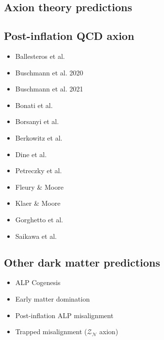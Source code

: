 \documentclass[8pt,twocolumn]{extarticle}
\begin{document}
\begin{mdframed}
\vspace{-1em}
\section{Axion theory predictions}\vspace{-0.5em}
\subsection{Post-inflation QCD axion}
\begin{itemize}\setlength\itemsep{-0.5em}
	\item Ballesteros et al.~\cite{Ballesteros:2016euj}	
	\item Buschmann et al. 2020~\cite{Buschmann:2019icd}
	\item Buschmann et al. 2021~\cite{Buschmann:2021sdq}
	\item Bonati et al.~\cite{Bonati:2015vqz}
	\item Borsanyi et al.~\cite{Borsanyi:2016ksw}
	\item Berkowitz et al.~\cite{Berkowitz:2015aua}
	\item Dine et al.~\cite{Dine:2017swf}
	\item Petreczky et al.~\cite{Petreczky:2016vrs}
	\item Fleury \& Moore~\cite{Fleury:2015aca}
	\item Klaer \& Moore~\cite{Klaer:2017ond}
	\item Gorghetto et al.~\cite{Gorghetto:2021fsn}
	\item Saikawa et al.~\cite{IAXO:2019mpb}	
\end{itemize}

\subsection{Other dark matter predictions}
\begin{itemize}\setlength\itemsep{-0.5em}
	\item ALP Cogenesis~\cite{Co:2020xlh}
	\item Early matter domination~\cite{Blinov:2019rhb}
	\item Post-inflation ALP misalignment~\cite{Arias:2012az,OHare:2021zrq}
	\item Trapped misalignment ($\mathcal{Z}_\mathcal{N}$ axion)~\cite{DiLuzio:2021gos}
\end{itemize}
\end{mdframed}
\end{document}
